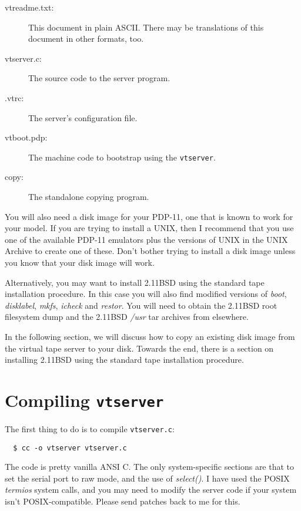\begin{description}
\item[vtreadme.txt:] This document in plain ASCII. There may be translations
	of this document in other formats, too.
\item[vtserver.c:] The source code to the server program.
\item[.vtrc:] The server's configuration file.
\item[vtboot.pdp:] The machine code to bootstrap using the {\tt vtserver}.
\item[copy:] The standalone copying program.
\end{description}

You will also need a disk image for your PDP-11, one that is known to work for
your model. If you are trying to install a UNIX, then I recommend that you use
one of the available PDP-11 emulators plus the versions of UNIX in the UNIX
Archive to create one of these. Don't bother trying to install a disk image
unless you know that your disk image will work.

Alternatively, you may want to install 2.11BSD using the standard tape
installation procedure. In this case you will also find modified versions
of {\it boot}, {\it disklabel}, {\it mkfs}, {\it icheck} and {\it restor}.
You will need to obtain the 2.11BSD root filesystem dump and the 2.11BSD
{\it /usr} tar archives from elsewhere.

In the following section, we will discuss how to copy an existing disk
image from the virtual tape server to your disk. Towards the end, there is
a section on installing 2.11BSD using the standard tape installation procedure.

\section{Compiling {\tt vtserver}}

The first thing to do is to compile {\tt vtserver.c}:

\begin{verbatim}
  $ cc -o vtserver vtserver.c
\end{verbatim}

The code is pretty vanilla ANSI C. The only system-specific sections are that
to set the serial port to raw mode, and the use of {\it select()}. I have
used the POSIX {\it termios} system calls, and you may need to modify the
server code if your system isn't POSIX-compatible. Please send patches back to
me for this.

